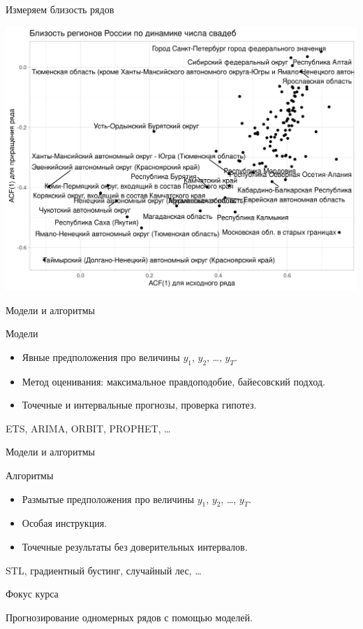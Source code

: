 \begin{frame}{Измеряем близость рядов}

  \includegraphics[width=\textwidth]{pictures/om_ts_01-025.png}


\end{frame}



\begin{frame}{Модели и алгоритмы}

\begin{block}{Модели}
\begin{itemize}[<+->]
  \item Явные предположения про величины $y_1$, $y_2$, \ldots, $y_T$.
  \item Метод оценивания: максимальное правдоподобие, байесовский подход.
  \item Точечные и интервальные прогнозы, проверка гипотез. 
\end{itemize}
\end{block}

ETS, ARIMA, ORBIT, PROPHET, \ldots

\end{frame}

\begin{frame}{Модели и алгоритмы}

\begin{block}{Алгоритмы}
  \begin{itemize}[<+->]
    \item Размытые предположения про величины $y_1$, $y_2$, \ldots, $y_T$.
    \item Особая инструкция.
    \item Точечные результаты без доверительных интервалов. 
  \end{itemize}
\end{block}
  
STL, градиентный бустинг, случайный лес, \ldots

\end{frame}

\begin{frame}{Фокус курса}

Прогнозирование одномерных рядов с помощью моделей. 

\end{frame}



